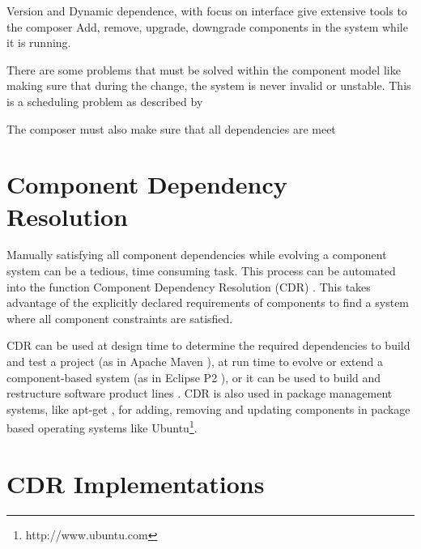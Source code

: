 Version and Dynamic dependence, with focus on interface give extensive tools to the composer 
Add, remove, upgrade, downgrade components in the system while it is running.



There are some problems that must be solved within the component model like making sure that during the change,
the system is never invalid or unstable. 
This is a scheduling problem as described by %

The composer must also make sure that all dependencies are meet

\section{Component Dependency Resolution}
Manually satisfying all component dependencies while evolving a component system can be a tedious, time consuming task.
This process can be automated into the function Component Dependency Resolution (CDR) \cite{Jenson2010}.
This takes advantage of the explicitly declared requirements of components to find a system where all component constraints are satisfied.

CDR can be used at design time to determine the required dependencies to build and test a project (as in Apache Maven \cite{casey_better_2008}),
at run time to evolve or extend a component-based system (as in Eclipse P2 \cite{leBerre2010}),
or it can be used to build and restructure software product lines \cite{savolainen_analyzing_2007}.
CDR is also used in package management systems, like apt-get \cite{Barth2005},
for adding, removing and updating components in package based operating systems like Ubuntu\footnote{http://www.ubuntu.com}. 


\section{CDR Implementations}

